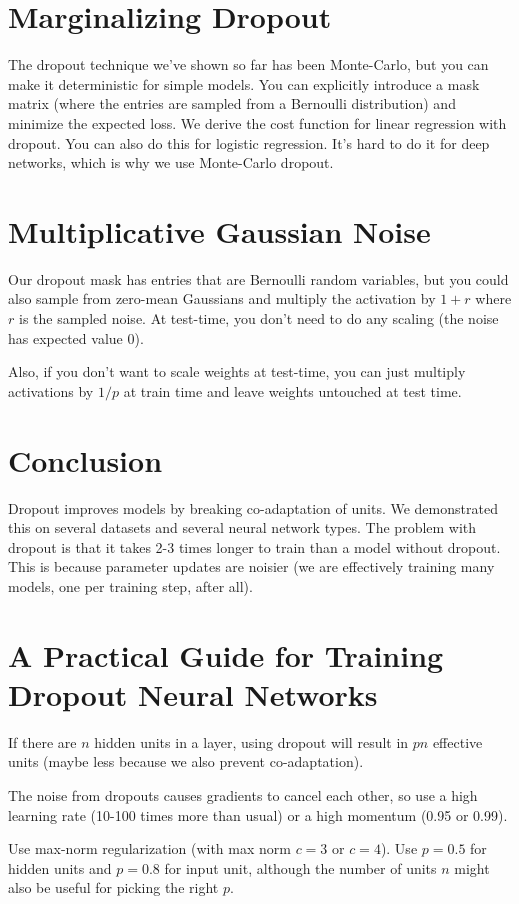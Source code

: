 \documentclass[a4paper]{article}
\begin{document}
\section{Marginalizing Dropout}
The dropout technique we've shown so far has been Monte-Carlo, but you can
make it deterministic for simple models. You can explicitly introduce a mask
matrix (where the entries are sampled from a Bernoulli distribution) and
minimize the expected loss. We derive the cost function for linear regression
with dropout. You can also do this for logistic regression. It's hard to do it
for deep networks, which is why we use Monte-Carlo dropout.

\section{Multiplicative Gaussian Noise}
Our dropout mask has entries that are Bernoulli random variables, but you could
also sample from zero-mean Gaussians and multiply the activation by $1 + r$
where $r$ is the sampled noise. At test-time, you don't need to do any scaling
(the noise has expected value 0).

Also, if you don't want to scale weights at test-time, you can just multiply
activations by $1/p$ at train time and leave weights untouched at test time.

\section{Conclusion}
Dropout improves models by breaking co-adaptation of units. We demonstrated
this on several datasets and several neural network types. The problem with
dropout is that it takes 2-3 times longer to train than a model without
dropout. This is because parameter updates are noisier (we are effectively
training many models, one per training step, after all).

\section{A Practical Guide for Training Dropout Neural Networks}
If there are $n$ hidden units in a layer, using dropout will result in $pn$
effective units (maybe less because we also prevent co-adaptation).

The noise from dropouts causes gradients to cancel each other, so use a high
learning rate (10-100 times more than usual) or a high momentum (0.95 or 0.99).

Use max-norm regularization (with max norm $c = 3$ or $c = 4$). Use $p = 0.5$
for hidden units and $p = 0.8$ for input unit, although the number of units
$n$ might also be useful for picking the right $p$.
\end{document}
